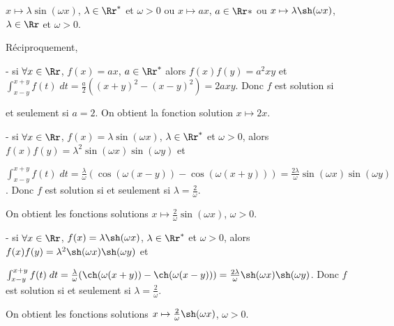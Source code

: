 {{\begin{center}
$x\mapsto\lambda\sin(\omega x)$, $\lambda\in\Rr^*$ et $\omega>0$ ou $x\mapsto ax$, $a\in\Rr*$ ou $x\mapsto \lambda\sh(\omega x)$, $\lambda\in\Rr$ et $\omega>0$.
\end{center}

Réciproquement,

- si $\forall x\in\Rr$, $f(x)=ax$, $a\in\Rr^*$ alors $f(x)f(y)=a^2xy$ et $\int_{x-y}^{x+y}f(t)\;dt= \frac{a}{2}((x+y)^2-(x-y)^2)=2axy$. Donc $f$ est solution si

et seulement si $a=2$. On obtient la fonction solution $x\mapsto2x$.

- si $\forall x\in\Rr$, $f(x)=\lambda\sin(\omega x)$, $\lambda\in\Rr^*$ et $\omega>0$, alors $f(x)f(y)=\lambda^2\sin(\omega x)\sin(\omega y)$ et 

$\int_{x-y}^{x+y}f(t)\;dt= \frac{\lambda}{\omega}(\cos(\omega(x-y))-\cos(\omega(x+y)))= \frac{2\lambda}{\omega}\sin(\omega x)\sin(\omega y)$. Donc $f$ est solution si et seulement si $\lambda= \frac{2}{\omega}$.

On obtient les fonctions solutions $x\mapsto \frac{2}{\omega}\sin(\omega x)$, $\omega>0$.

- si $\forall x\in\Rr$, $f(x)=\lambda\sh(\omega x)$, $\lambda\in\Rr^*$ et $\omega>0$, alors $f(x)f(y)=\lambda^2\sh(\omega x)\sh(\omega y)$ et 

$\int_{x-y}^{x+y}f(t)\;dt= \frac{\lambda}{\omega}(\ch(\omega(x+y))-\ch(\omega(x-y)))= \frac{2\lambda}{\omega}\sh(\omega x)\sh(\omega y)$. Donc $f$ est solution si et seulement si $\lambda= \frac{2}{\omega}$.

On obtient les fonctions solutions $x\mapsto \frac{2}{\omega}\sh(\omega x)$, $\omega>0$.}
}